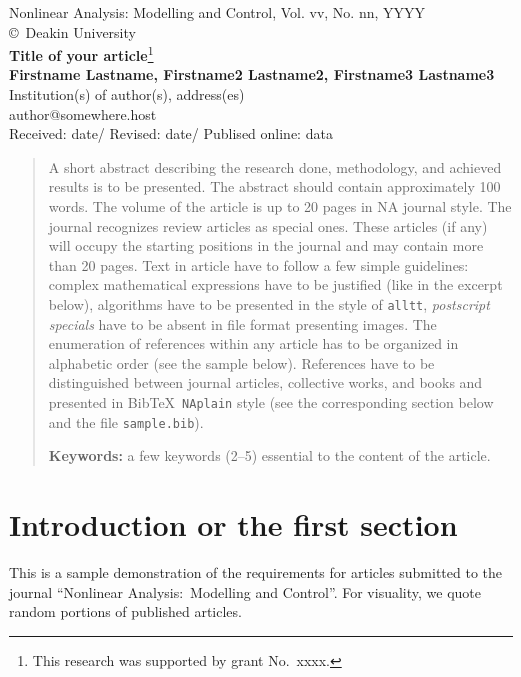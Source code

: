 \documentclass[a4paper, 10pt]{article}
\begin{document}
\begin{center}
Nonlinear Analysis: Modelling and Control, Vol. vv, No. nn, YYYY\\
\copyright\ Deakin University\\[24pt]
\LARGE
\textbf{Title of your article}\footnote{This research was supported by grant No.\ xxxx.}\\[6pt]
\small
\textbf {Firstname Lastname, Firstname2 Lastname2, Firstname3 Lastname3}\\[6pt]
Institution(s) of author(s), address(es) \\ author@somewhere.host\\[6pt]
Received: date\quad/\quad
Revised: date\quad/\quad
Publised online: data
\end{center}

\begin{abstract}
A short abstract describing the research done, methodology, and achieved results is to be presented. The abstract should contain approximately 100 words. The volume of the article is up to 20 pages in NA journal style. The journal recognizes review articles as special ones. These articles (if any) will occupy the starting positions in the journal and may contain more than 20 pages. Text in article have to follow a few simple guidelines: complex mathematical expressions have to be justified (like in the excerpt below), algorithms have to be presented in the style of \texttt{alltt}, \textit{postscript specials} have to be absent in file format presenting images. The enumeration of references within any article has to be organized in alphabetic order (see the sample below). References have to be distinguished between journal articles, collective works, and books and presented in BibTeX\ \texttt{NAplain} style (see the corresponding section below and the file \texttt{sample.bib}). \vskip 2mm

\textbf{Keywords:} a few keywords (2--5) essential to the content of the article.

\end{abstract}

\nocite{2009ProcDETAp}

\section{Introduction or the first section}\label{s:1}
This is a sample demonstration of the requirements for articles submitted to the journal ``Nonlinear Analysis:\ Modelling and Control''. For visuality, we quote random portions of published articles.
\end{document}

